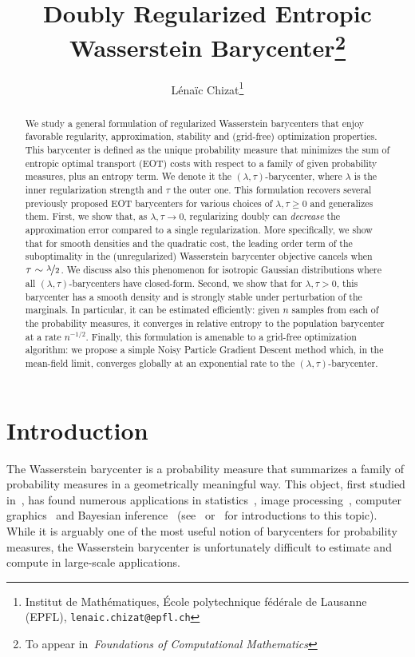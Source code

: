 \documentclass[11pt]{article}
\title{
Doubly Regularized Entropic Wasserstein Barycenter\footnote{To appear in~\emph{Foundations of Computational Mathematics}}
}
\author{
L\'ena\"ic Chizat\thanks{Institut de Mathématiques, École polytechnique fédérale de Lausanne (EPFL), \texttt{lenaic.chizat@epfl.ch}} 
}
\newcommand{\rev}[1]{{#1}}
\begin{document}
\maketitle

\begin{abstract}
We study a general formulation of regularized Wasserstein barycenters that enjoy favorable regularity, approximation, stability and (grid-free) optimization properties.
%
This barycenter is defined as the unique probability measure that minimizes the sum of entropic optimal transport (EOT) costs with respect to a family of given probability measures, plus an entropy term. We denote it the $(\lambda,\tau)$-barycenter, where $\lambda$ is the inner regularization strength and $\tau$ the outer one. This formulation recovers several previously proposed EOT barycenters for various choices of $\lambda,\tau \geq 0$ and generalizes them.
%
\rev{First, we show that, as $\lambda, \tau \to 0$, regularizing doubly can \emph{decrease} the approximation error compared to a single regularization. More specifically, we show that for smooth densities and the quadratic cost, the leading order term of the suboptimality in the (unregularized) Wasserstein barycenter objective cancels when $\tau\sim \nicefrac{\lambda}{2}$.} We discuss also this phenomenon for isotropic Gaussian distributions where all $(\lambda,\tau)$-barycenters have closed-form.
%
Second, we show that for $\lambda,\tau>0$, this barycenter has a smooth density and is strongly stable under perturbation of the marginals. In particular, it can be estimated efficiently: given $n$ samples from each of the probability measures, it converges in relative entropy to the population barycenter at a rate $n^{-1/2}$.
%
Finally, this formulation is amenable to a grid-free optimization algorithm: we propose a simple Noisy Particle Gradient Descent method which, in the mean-field limit, converges globally at an exponential rate to the $(\lambda,\tau)$-barycenter. 
\end{abstract}


\section{Introduction}
The Wasserstein barycenter is a probability measure that summarizes a family of probability measures in a geometrically meaningful way. This object, first studied in~\cite{agueh2011barycenters}, has found numerous applications in statistics~\cite{bassetti2006minimum, boissard2015distribution, bernton2019parameter}, image processing~\cite{rabin2011wasserstein}, computer graphics~\cite{solomon2015convolutional} and Bayesian inference~\cite{srivastava2018scalable, backhoff2022bayesian} (see~\cite[Chap.~9.2]{peyre2019computational} or~\cite{panaretos2020invitation} for introductions to this topic). While it is arguably one of the most useful notion of barycenters for probability measures, the Wasserstein barycenter is unfortunately difficult to estimate and compute in large-scale applications.
\end{document}
